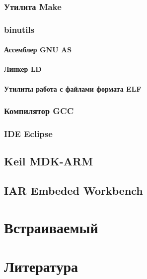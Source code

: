 \documentclass[oneside,12pt]{book}
\begin{document}
\section{Утилита Make}
\section{binutils}
\subsection{Ассемблер GNU AS}
\subsection{Линкер LD}
\subsection{Утилиты работа с файлами формата ELF}
\section{Компилятор GCC}
\section{IDE Eclipse}
\chapter{Keil MDK-ARM}
\chapter{IAR Embeded Workbench}

\part{Встраиваемый \cpp}

\part{Литература}
\end{document}
